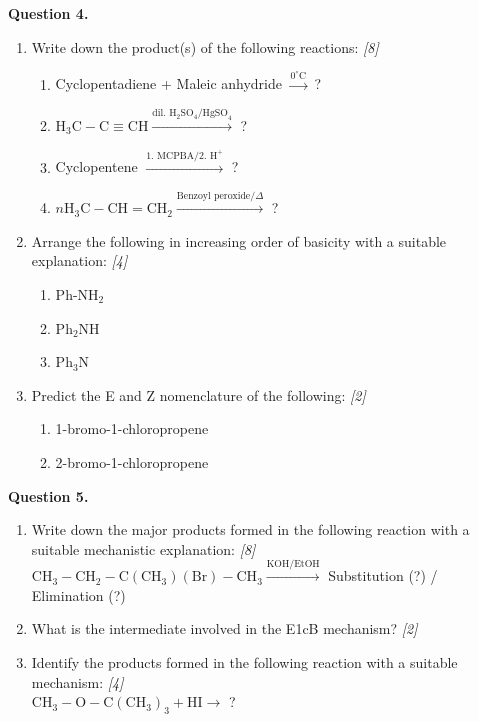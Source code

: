 \documentclass[11pt,a4paper]{article}
\newcommand{\pts}[1]{\hfill \textit{[#1]}}
\begin{document}
\noindent \textbf{Question 4.}
\begin{enumerate}[label=(\alph*)]
  \item Write down the product(s) of the following reactions: \pts{8}
  \begin{enumerate}[label=(\roman*)]
    \item Cyclopentadiene + Maleic anhydride $\xrightarrow{0^\circ\text{C}}$ ?
    \item $\text{H}_3\text{C}-\text{C}\equiv\text{CH} \xrightarrow{\text{dil. }\text{H}_2\text{SO}_4 / \text{HgSO}_4}$ ?
    \item Cyclopentene $\xrightarrow{1.\text{ MCPBA} / 2.\text{ H}^+}$ ?
    \item $n\text{H}_3\text{C}-\text{CH}=\text{CH}_2 \xrightarrow{\text{Benzoyl peroxide} / \Delta}$ ?
  \end{enumerate}
  \item Arrange the following in increasing order of basicity with a suitable explanation: \pts{4}
  \begin{enumerate}[label=(\roman*)]
    \item $\text{Ph-NH}_2$
    \item $\text{Ph}_2\text{NH}$
    \item $\text{Ph}_3\text{N}$
  \end{enumerate}
  \item Predict the E and Z nomenclature of the following: \pts{2}
  \begin{enumerate}[label=(\roman*)]
    \item 1-bromo-1-chloropropene
    \item 2-bromo-1-chloropropene
  \end{enumerate}
\end{enumerate}

\bigskip

\noindent \textbf{Question 5.}
\begin{enumerate}[label=(\alph*)]
  \item Write down the major products formed in the following reaction with a suitable mechanistic explanation: \pts{8}\\
  $\text{CH}_3-\text{CH}_2-\text{C}(\text{CH}_3)(\text{Br})-\text{CH}_3 \xrightarrow{\text{KOH/EtOH}}$ Substitution (?) / Elimination (?)
  \item What is the intermediate involved in the E1cB mechanism? \pts{2}
  \item Identify the products formed in the following reaction with a suitable mechanism: \pts{4}\\
  $\text{CH}_3-\text{O}-\text{C}(\text{CH}_3)_3 + \text{HI} \rightarrow$ ?
\end{enumerate}
\end{document}
